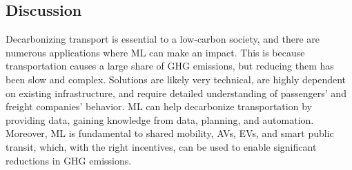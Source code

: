 \documentclass[11pt]{report}
\begin{document}
\subsection{Discussion}
Decarbonizing transport is essential to a low-carbon society, and there are numerous applications where ML can make an impact. This is because transportation causes a large share of GHG emissions, but reducing them has been slow and complex. Solutions are likely very technical, are highly dependent on existing infrastructure, and require detailed understanding of passengers' and freight companies' behavior. ML can help decarbonize transportation by providing data, gaining knowledge from data, planning, and automation. Moreover, ML is fundamental to shared mobility, AVs, EVs, and smart public transit, which, with the right incentives, can be used to enable significant reductions in GHG emissions.
\end{document}
